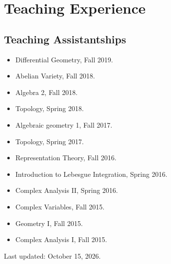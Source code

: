 \documentclass[letterpaper]{article}
\begin{document}
\section*{Teaching Experience}
\subsection*{Teaching Assistantships}
\begin{itemize}
\item Differential Geometry, Fall 2019.
\item Abelian Variety, Fall 2018.
\item Algebra 2, Fall 2018.
\item Topology, Spring 2018.
\item Algebraic geometry 1, Fall 2017.
\item Topology, Spring 2017.
\item Representation Theory, Fall 2016.
\item Introduction to Lebesgue Integration, Spring 2016.
\item Complex Analysis II, Spring 2016.
\item Complex Variables,  Fall 2015.
\item Geometry I, Fall 2015.
\item Complex Analysis I, Fall 2015.
\end{itemize}












\vfill

\begin{center}
  \begin{footnotesize}
    Last updated: October 15, 2026.
  \end{footnotesize}
\end{center}
\end{document}
